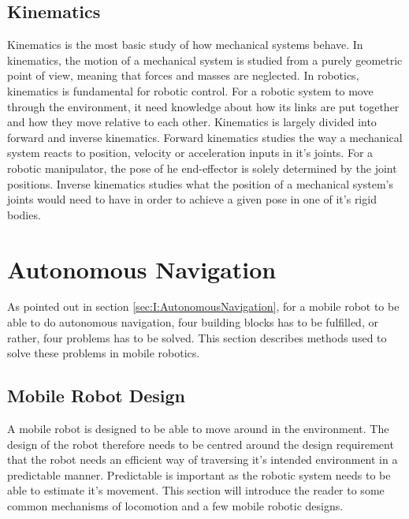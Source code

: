 \subsection{Kinematics}
Kinematics is the most basic study of how mechanical systems behave\cite{SiegwartRoland2011Itam}. In kinematics, the motion of a mechanical system is studied from a purely geometric point of view, meaning that forces and masses are neglected. In robotics, kinematics is fundamental for robotic control. For a robotic system to move through the environment, it need knowledge about how  its links are put together and how they move relative to each other. Kinematics is largely divided into forward and inverse kinematics. Forward kinematics studies the way a mechanical system reacts to position, velocity or acceleration inputs in it's joints. For a robotic manipulator, the pose of he end-effector is solely determined by the joint positions. Inverse kinematics studies what the position of a mechanical system's joints would need to have in order to achieve a given pose in one of it's rigid bodies.



\section{Autonomous Navigation}
As pointed out in section \ref{sec:I:AutonomousNavigation}, for a mobile robot to be able to do autonomous navigation, four building blocks has to be fulfilled, or rather, four problems has to be solved. This section describes methods used to solve these problems in mobile robotics.

\subsection{Mobile Robot Design}
A mobile robot is designed to be able to move around in the environment. The design of the robot therefore needs to be centred around the design requirement that the robot needs an efficient way of traversing it's intended environment in a predictable manner. Predictable is important as the robotic system needs to be able to estimate it's movement. This section will introduce the reader to some common mechanisms of locomotion and a few mobile robotic designs.

